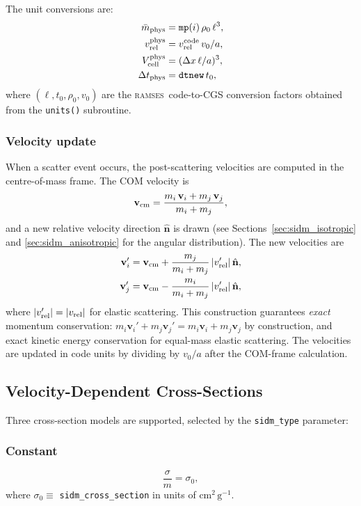 \documentclass[fleqn,usenatbib]{mnras}
\newcommand{\ramses}{\textsc{ramses}}
\newcommand{\code}[1]{\texttt{#1}}
\newcommand{\vrel}{v_{\rm rel}}
\newcommand{\vcm}{\mathbf{v}_{\rm cm}}
\begin{document}
The unit conversions are:
\begin{align}
\bar{m}_{\rm phys} &= \code{mp}(i)\,\rho_0\,\ell^3, \label{eq:mass_phys}\\
\vrel^{\rm phys} &= \vrel^{\rm code}\,v_0/a, \label{eq:vrel_phys}\\
V_{\rm cell}^{\rm phys} &= (\Delta x\,\ell/a)^3, \label{eq:vcell_phys}\\
\Delta t_{\rm phys} &= \code{dtnew}\,t_0, \label{eq:dt_phys}
\end{align}
where $(\ell, t_0, \rho_0, v_0)$ are the \ramses\ code-to-CGS
conversion factors obtained from the \code{units()} subroutine.

\subsubsection{Velocity update}

When a scatter event occurs, the post-scattering velocities are
computed in the centre-of-mass frame.  The COM velocity is
\begin{equation}
\vcm = \frac{m_i\,\mathbf{v}_i + m_j\,\mathbf{v}_j}{m_i + m_j},
\label{eq:vcm}
\end{equation}
and a new relative velocity direction $\hat{\mathbf{n}}$ is drawn
(see Sections~\ref{sec:sidm_isotropic} and \ref{sec:sidm_anisotropic}
for the angular distribution).  The new velocities are
\begin{align}
\mathbf{v}_i' &= \vcm + \frac{m_j}{m_i+m_j}\,|\vrel'|\,\hat{\mathbf{n}},
\label{eq:vi_new}\\
\mathbf{v}_j' &= \vcm - \frac{m_i}{m_i+m_j}\,|\vrel'|\,\hat{\mathbf{n}},
\label{eq:vj_new}
\end{align}
where $|\vrel'| = |\vrel|$ for elastic scattering.  This
construction guarantees \emph{exact} momentum conservation:
$m_i\mathbf{v}_i'+m_j\mathbf{v}_j' = m_i\mathbf{v}_i+m_j\mathbf{v}_j$
by construction, and exact kinetic energy conservation for equal-mass
elastic scattering.  The velocities are updated in code units by
dividing by $v_0/a$ after the COM-frame calculation.

\subsection{Velocity-Dependent Cross-Sections}
\label{sec:sidm_sigma}

Three cross-section models are supported, selected by the
\code{sidm\_type} parameter:

\subsubsection{Constant}
\begin{equation}
\frac{\sigma}{m} = \sigma_0,
\label{eq:sigma_const}
\end{equation}
where $\sigma_0 \equiv$ \code{sidm\_cross\_section} in units of
$\mathrm{cm^2\,g^{-1}}$.
\end{document}
